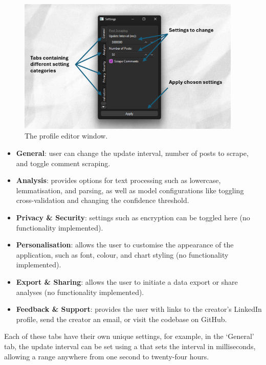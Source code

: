     \begin{figure}[h]
        \centering
            \includegraphics[width=0.95\textwidth]{figures/settings-window-labels.png}
        \caption{The profile editor window.}
    \end{figure}
    
    \begin{itemize}
        \item \textbf{General}: user can change the update interval, number of posts to scrape, and toggle comment scraping.
        \item \textbf{Analysis}: provides options for text processing such as lowercase, lemmatisation, and  parsing, as well as model configurations like toggling cross-validation and changing the confidence threshold.
        \item \textbf{Privacy \& Security}: settings such as encryption can be toggled here (no functionality implemented).
        \item \textbf{Personalisation}: allows the user to customise the appearance of the application, such as font, colour, and chart styling (no functionality implemented).
        \item \textbf{Export \& Sharing}: allows the user to initiate a data export or share analyses (no functionality implemented).
        \item \textbf{Feedback \& Support}: provides the user with links to the creator's LinkedIn profile, send the creator an email, or visit the codebase on GitHub.
    \end{itemize}

    Each of these tabs have their own unique settings, for example, in the `General' tab, the update interval can be set using a  that sets the interval in milliseconds, allowing a range anywhere from one second to twenty-four hours.

